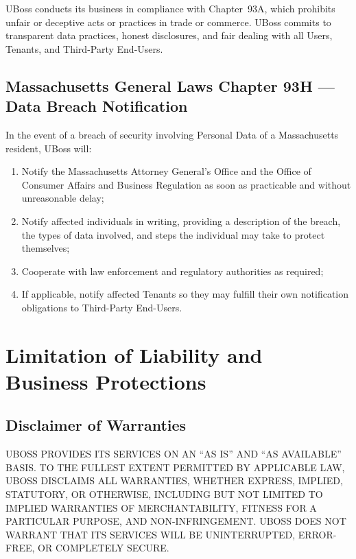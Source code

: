 \documentclass[11pt, letterpaper]{article}
\begin{document}
UBoss conducts its business in compliance with Chapter~93A, which prohibits unfair or
deceptive acts or practices in trade or commerce. UBoss commits to transparent data
practices, honest disclosures, and fair dealing with all Users, Tenants, and
Third-Party End-Users.

\subsection{Massachusetts General Laws Chapter 93H --- Data Breach Notification}

In the event of a breach of security involving Personal Data of a Massachusetts
resident, UBoss will:

\begin{enumerate}
    \item Notify the Massachusetts Attorney General's Office and the Office of Consumer
          Affairs and Business Regulation as soon as practicable and without unreasonable
          delay;
    \item Notify affected individuals in writing, providing a description of the breach,
          the types of data involved, and steps the individual may take to protect
          themselves;
    \item Cooperate with law enforcement and regulatory authorities as required;
    \item If applicable, notify affected Tenants so they may fulfill their own
          notification obligations to Third-Party End-Users.
\end{enumerate}

\section{Limitation of Liability and Business Protections}

\subsection{Disclaimer of Warranties}

UBOSS PROVIDES ITS SERVICES ON AN ``AS IS'' AND ``AS AVAILABLE'' BASIS. TO THE FULLEST
EXTENT PERMITTED BY APPLICABLE LAW, UBOSS DISCLAIMS ALL WARRANTIES, WHETHER EXPRESS,
IMPLIED, STATUTORY, OR OTHERWISE, INCLUDING BUT NOT LIMITED TO IMPLIED WARRANTIES OF
MERCHANTABILITY, FITNESS FOR A PARTICULAR PURPOSE, AND NON-INFRINGEMENT. UBOSS DOES
NOT WARRANT THAT ITS SERVICES WILL BE UNINTERRUPTED, ERROR-FREE, OR COMPLETELY SECURE.
\end{document}
